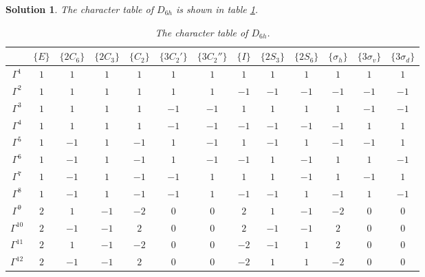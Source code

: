 \documentclass[UTF8,10pt,a4paper]{article}
\theoremstyle{Problem}
\theoremstyle{Solution}
\newtheorem*{sol}{Solution}
\begin{document}
\begin{sol}
    The character table of $D_{6h}$ is shown in table \ref{CT}.
    \newpage
    \begin{table}[h]
        \centering
        \caption{The character table of $D_{6h}$.}
        \label{CT}
        \begin{tabular}{c|cccccccccccc}
            & $\{E\}$ & $\{2C_6\}$ & $\{2C_3\}$ & $\{C_2\}$ & $\{3C_2'\}$ & $\{3C_2''\}$ & $\{I\}$ & $\{2S_3\}$ & $\{2S_6\}$ & $\{\sigma_h\}$ & $\{3\sigma_v\}$ & $\{3\sigma_d\}$ \\ \hline
           $\Gamma^1$ & $1$ & $1$ & $1$ & $1$ & $1$ & $1$ & $1$ & $1$ & $1$ & $1$ & $1$ & $1$ \\
           $\Gamma^2$ & $1$ & $1$ & $1$ & $1$ & $1$ & $1$ & $-1$ & $-1$ & $-1$ & $-1$ & $-1$ & $-1$ \\
           $\Gamma^3$ & $1$ & $1$ & $1$ & $1$ & $-1$ & $-1$ & $1$ & $1$ & $1$ & $1$ & $-1$ & $-1$ \\
           $\Gamma^4$ & $1$ & $1$ & $1$ & $1$ & $-1$ & $-1$ & $-1$ & $-1$ & $-1$ & $-1$ & $1$ & $1$ \\
           $\Gamma^5$ & $1$ & $-1$ & $1$ & $-1$ & $1$ & $-1$ & $1$ & $-1$ & $1$ & $-1$ & $-1$ & $1$ \\
           $\Gamma^6$ & $1$ & $-1$ & $1$ & $-1$ & $1$ & $-1$ & $-1$ & $1$ & $-1$ & $1$ & $1$ & $-1$ \\
           $\Gamma^7$ & $1$ & $-1$ & $1$ & $-1$ & $-1$ & $1$ & $1$ & $1$ & $-1$ & $1$ & $-1$ & $1$ \\
           $\Gamma^8$ & $1$ & $-1$ & $1$ & $-1$ & $-1$ & $1$ & $-1$ & $-1$ & $1$ & $-1$ & $1$ & $-1$ \\
           $\Gamma^9$ & $2$ & $1$ & $-1$ & $-2$ & $0$ & $0$ & $2$ & $1$ & $-1$ & $-2$ & $0$ & $0$ \\
           $\Gamma^{10}$ & $2$ & $-1$ & $-1$ & $2$ & $0$ & $0$ & $2$ & $-1$ & $-1$ & $2$ & $0$ & $0$ \\
           $\Gamma^{11}$ & $2$ & $1$ & $-1$ & $-2$ & $0$ & $0$ & $-2$ & $-1$ & $1$ & $2$ & $0$ & $0$ \\
           $\Gamma^{12}$ & $2$ & $-1$ & $-1$ & $2$ & $0$ & $0$ & $-2$ & $1$ & $1$ & $-2$ & $0$ & $0$
        \end{tabular}
    \end{table}
\end{sol}
\end{document}
